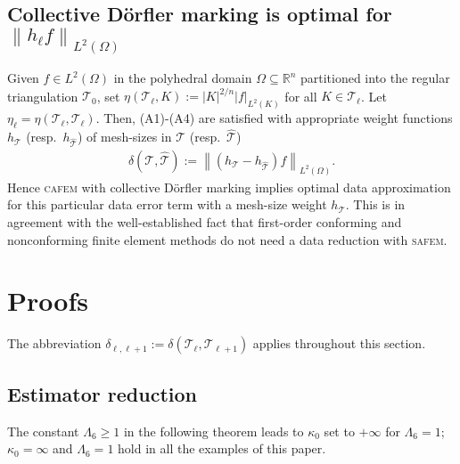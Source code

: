 \documentclass{siamltex1213}
\begin{document}
\subsection{Collective D\"orfler marking is optimal for ${{\left\lVert {h_{{\ell}}f} \right\rVert_{L^2(\Omega)}}}$}\label{ssec:Doerfler}
Given $f\in {L^2(\Omega)}$ in the polyhedral domain $\Omega \subseteq \mathbb R^n$ partitioned
into the regular triangulation ${\mathcal T_{0}}$, set $\eta({\mathcal T_{\ell}},K):={\left\lvert {K} \right\rvert}^{2/n} \vert f \vert_{L^2(K)}$ for all $K \in {\mathcal T_{\ell}}$.
Let $\eta_\ell=\eta({\mathcal T_{\ell}}, {\mathcal T_{\ell}})$. Then, (A1)-(A4) are satisfied with appropriate weight functions $h_{\mathcal{T}}$ (resp.\ $h_{\hat{\mathcal{T}}}$) of mesh-sizes in ${\mathcal{T}}$ (resp.\ ${\hat{\mathcal{T}}}$)
\begin{align*}
	\delta({\mathcal{T}},{\hat{\mathcal{T}}}):= {\left\lVert {(h_{\mathcal{T}}-h_{\hat{\mathcal{T}}})f} \right\rVert_{{L^2(\Omega)}}}.
\end{align*}
Hence {\textsc{cafem}\xspace} with collective D\"orfler marking implies optimal data approximation
for this particular data error term with a mesh-size weight $h_{\mathcal{T}}$.
This is in agreement with the well-established fact that  first-order conforming and nonconforming finite element methods do not need  a data reduction with {\textsc{safem}\xspace}. 

\section{Proofs} \label{sec:optimality}
The abbreviation $\delta_{\ell,\ell+1}:=\delta({\mathcal T_{\ell}}, {\mathcal T_{{\ell+1}}})$ applies throughout this section.

\subsection{Estimator reduction}
The constant ${\ensuremath{\Lambda_{\mathrm{6}}}} \geq 1$ in the following theorem leads to $\kappa_0$ set to $+\infty$ for ${\ensuremath{\Lambda_{\mathrm{6}}}}=1$; 
$\kappa_0=\infty$ and ${\ensuremath{\Lambda_{\mathrm{6}}}}=1$ hold in all the examples of this paper.
\end{document}
